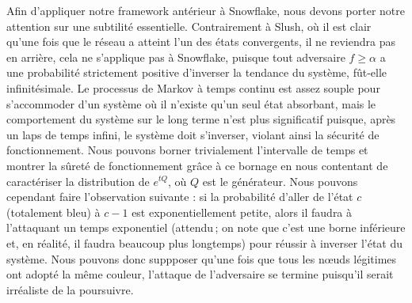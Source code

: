 \documentclass[a4,twocolumn,10pt]{article}
\theoremstyle{definition}
\begin{document}
\begin{appendices}
Afin d'appliquer notre framework antérieur à Snowflake, nous devons porter notre attention sur une subtilité essentielle.
Contrairement à Slush, où il est clair qu'une fois que le réseau a atteint l'un des états convergents, il ne reviendra pas en arrière, cela ne s'applique pas à Snowflake, puisque tout adversaire $f \geq \alpha$ a une probabilité strictement positive d'inverser la tendance du système, fût-elle infinitésimale.
Le processus de Markov à temps continu est assez souple pour s'accommoder d'un système où il n'existe qu'un seul état absorbant, mais le comportement du système sur le long terme n'est plus significatif puisque, après un laps de temps infini, le système doit s'inverser, violant ainsi la sécurité de fonctionnement.
Nous pouvons borner trivialement l'intervalle de temps et montrer la sûreté de fonctionnement grâce à ce bornage en nous contentant de caractériser la distribution de $e^{tQ}$, où $Q$ est le générateur.
Nous pouvons cependant faire l'observation suivante : si la probabilité d'aller de l'état $c$ (totalement bleu) à $c-1$ est exponentiellement petite, alors il faudra à l'attaquant un temps exponentiel (attendu\,; on note que c'est une borne inférieure et, en réalité, il faudra beaucoup plus longtemps) pour réussir à inverser l'état du système.
Nous pouvons donc suppposer qu'une fois que tous les nœuds légitimes ont adopté la même couleur, l'attaque de l'adversaire se termine puisqu'il serait irréaliste de la poursuivre.


\end{appendices}
\end{document}
